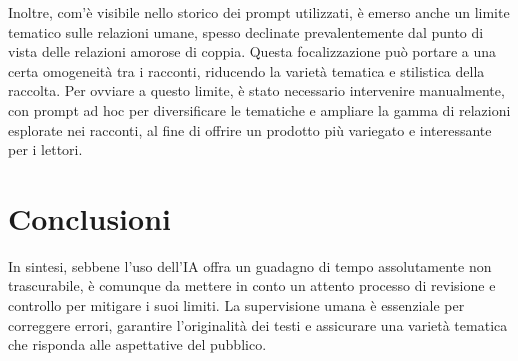 \documentclass[a4paper,12pt]{article}
\begin{document}
\bigbreak

Inoltre, com'è visibile nello storico dei prompt utilizzati, è emerso anche un limite tematico sulle relazioni umane, spesso declinate prevalentemente dal punto di vista delle relazioni amorose di coppia. Questa focalizzazione può portare a una certa omogeneità tra i racconti, riducendo la varietà tematica e stilistica della raccolta. Per ovviare a questo limite, è stato necessario intervenire manualmente, con prompt ad hoc per diversificare le tematiche e ampliare la gamma di relazioni esplorate nei racconti, al fine di offrire un prodotto più variegato e interessante per i lettori.


\section*{Conclusioni}

In sintesi, sebbene l'uso dell'IA offra un guadagno di tempo assolutamente non trascurabile, è comunque da mettere in conto un attento processo di revisione e controllo per mitigare i suoi limiti. La supervisione umana è essenziale per correggere errori, garantire l'originalità dei testi e assicurare una varietà tematica che risponda alle aspettative del pubblico.
\end{document}
